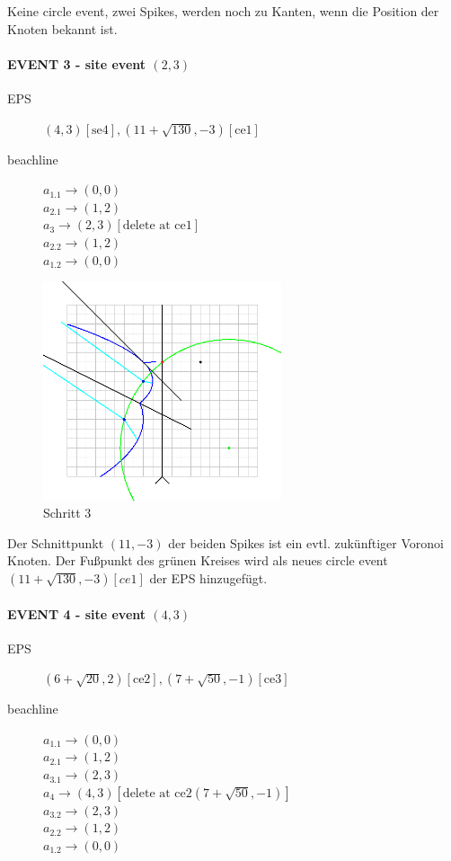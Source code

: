 Keine circle event, zwei Spikes, werden noch zu Kanten, wenn die Position der Knoten bekannt ist.

\newpage

\paragraph*{EVENT 3 - site event $(2,3)$}
\begin{description}
\item[EPS] $(4,3)[\text{se4}], (11 + \sqrt{130}, -3)[\text{ce1}]$
\item[beachline]
$a_{1.1} \rightarrow (0,0)$\\
$a_{2.1} \rightarrow (1,2)$\\
$a_3 \rightarrow (2,3) [\text{delete at ce1}]$\\
$a_{2.2} \rightarrow (1,2)$\\
$a_{1.2} \rightarrow (0,0)$
\end{description}

\begin{figure}[h]
\begin{center}
\includegraphics[width=7cm]{capture3}
\end{center}
\caption{Schritt 3}
\label{fig:c3}
\end{figure}

Der Schnittpunkt $(11, -3)$ der beiden Spikes ist ein evtl. zukünftiger Voronoi Knoten. Der Fußpunkt des grünen Kreises wird als neues circle event $(11 + \sqrt{130}, -3)[ce1]$ der EPS hinzugefügt.

\newpage

\paragraph*{EVENT 4 - site event $(4,3)$}
\begin{description}
\item[EPS] $(6 + \sqrt{20}, 2)[\text{ce2}], (7 + \sqrt{50}, -1)[\text{ce3}]$
\item[beachline]
$a_{1.1} \rightarrow (0,0)$\\
$a_{2.1} \rightarrow (1,2)$\\
$a_{3.1} \rightarrow (2,3)$\\
$a_4 \rightarrow (4,3)[\text{delete at ce2} (7 + \sqrt{50}, -1)]$\\
$a_{3.2} \rightarrow (2,3)$\\
$a_{2.2} \rightarrow (1,2)$\\
$a_{1.2} \rightarrow (0,0)$
\end{description}

